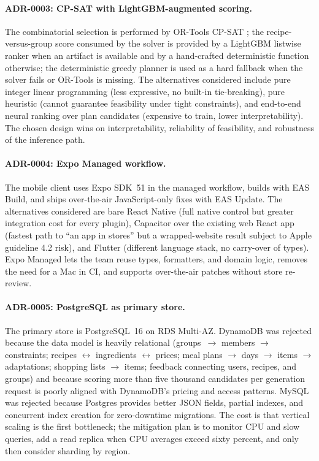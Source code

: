\paragraph{ADR-0003: CP-SAT with LightGBM-augmented scoring.} The combinatorial selection is performed by OR-Tools CP-SAT \cite{perron2023}; the recipe-versus-group score consumed by the solver is provided by a LightGBM listwise ranker \cite{ke2017} when an artifact is available and by a hand-crafted deterministic function otherwise; the deterministic greedy planner is used as a hard fallback when the solver fails or OR-Tools is missing. The alternatives considered include pure integer linear programming (less expressive, no built-in tie-breaking), pure heuristic (cannot guarantee feasibility under tight constraints), and end-to-end neural ranking over plan candidates (expensive to train, lower interpretability). The chosen design wins on interpretability, reliability of feasibility, and robustness of the inference path.

\paragraph{ADR-0004: Expo Managed workflow.} The mobile client uses Expo SDK~51 in the managed workflow, builds with EAS Build, and ships over-the-air JavaScript-only fixes with EAS Update. The alternatives considered are bare React Native (full native control but greater integration cost for every plugin), Capacitor over the existing web React app (fastest path to ``an app in stores'' but a wrapped-website result subject to Apple guideline 4.2 risk), and Flutter (different language stack, no carry-over of types). Expo Managed lets the team reuse types, formatters, and domain logic, removes the need for a Mac in CI, and supports over-the-air patches without store re-review.

\paragraph{ADR-0005: PostgreSQL as primary store.} The primary store is PostgreSQL~16 on RDS Multi-AZ. DynamoDB was rejected because the data model is heavily relational (groups~$\rightarrow$ members $\rightarrow$ constraints; recipes $\leftrightarrow$ ingredients $\leftrightarrow$ prices; meal plans $\rightarrow$ days $\rightarrow$ items $\rightarrow$ adaptations; shopping lists $\rightarrow$ items; feedback connecting users, recipes, and groups) and because scoring more than five thousand candidates per generation request is poorly aligned with DynamoDB's pricing and access patterns. MySQL was rejected because Postgres provides better JSON fields, partial indexes, and concurrent index creation for zero-downtime migrations. The cost is that vertical scaling is the first bottleneck; the mitigation plan is to monitor CPU and slow queries, add a read replica when CPU averages exceed sixty percent, and only then consider sharding by region.

